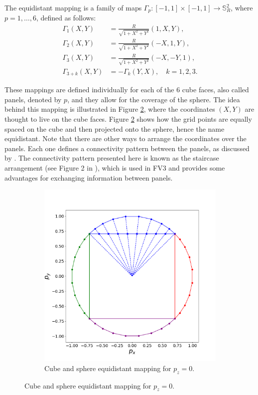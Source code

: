 \documentclass[preprint,12pt]{elsarticle}
\begin{document}
\begin{linenumbers}
The equidistant mapping is a family of maps ${\Gamma}_{p}: [-1,1] \times [-1,1] \to \mathbb{S}^2_R$, where $p=1, \ldots, 6$, defined as follows:
\begin{align}
	\label{gamma_1}
	{\Gamma}_{1}(X,Y) &= \frac{R}{\sqrt{1 + X^2 + Y^2}}(1, X, Y),\\ 
	\label{gamma_2}
	{\Gamma}_{2}(X,Y) &= \frac{R}{\sqrt{1 + X^2 + Y^2}}(-X, 1, Y), \\
	\label{gamma_3}
	{\Gamma}_{3}(X,Y) &= \frac{R}{\sqrt{1 + X^2 + Y^2}}(-X, -Y, 1), \\
	\label{gamma_456}
{\Gamma}_{3+k}(X,Y)&=-{\Gamma}_{k}(Y,X),\quad k=1,2,3.
\end{align}

These mappings are defined individually for each of the 6 cube faces, also called panels, denoted by $p$, and they allow for the coverage of the sphere.
The idea behind this mapping is illustrated in Figure \ref{sph-cube-equidist}, where the coordinates $(X,Y)$ are thought to live on the cube faces.
Figure \ref{sph-cube-equidist} shows how the grid points are equally spaced on the cube and then projected onto the sphere, hence the name equidistant.
Note that there are other ways to arrange the coordinates over the panels.
Each one defines a connectivity pattern between the panels, as discussed by \cite[Section 2.1]{chen:2021}.
The connectivity pattern presented here is known as the staircase arrangement (see Figure 2 in \cite{chen:2021}), which is used in FV3 and provides some advantages for exchanging information between panels.
\begin{figure}[!htb]
	\centering
	\begin{subfigure}{0.45\textwidth}
		\centering
		\includegraphics[width=1.1\linewidth]{g1}
		\caption{Cube and sphere equidistant mapping for $p_z=0$.\label{sph-cube-equidist}}
	\end{subfigure}



\end{figure}
\end{linenumbers}
\end{document}
